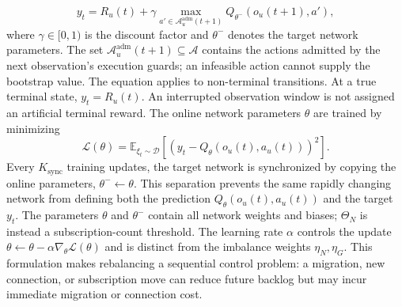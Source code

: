 \begin{equation}
	y_t =
	R_u(t) + \gamma
	\max_{a'\in\mathcal{A}^{\mathrm{adm}}_u(t+1)}Q_{\theta^-}(o_u(t+1),a'),
	\label{eq:dql_target}
\end{equation}
where $\gamma\in[0,1)$ is the discount factor and $\theta^-$ denotes the target
network parameters. The set $\mathcal{A}^{\mathrm{adm}}_u(t+1)\subseteq\mathcal{A}$
contains the actions admitted by the next observation's execution guards;
an infeasible action cannot supply the bootstrap value. The equation applies
to non-terminal transitions. At a true terminal state, $y_t=R_u(t)$.
An interrupted observation window is not assigned an artificial terminal
reward. The online network parameters $\theta$ are trained by
minimizing
\begin{equation}
	\mathcal{L}(\theta)=
	\mathbb{E}_{\xi_t\sim\mathcal{D}}
	\left[
	\left(y_t-Q_\theta(o_u(t),a_u(t))\right)^2
	\right].
	\label{eq:dql_loss}
\end{equation}
Every $K_{\mathrm{sync}}$ training updates, the target network is synchronized by copying the
online parameters, $\theta^- \leftarrow \theta$. This separation prevents the
same rapidly changing network from defining both the prediction
$Q_\theta(o_u(t),a_u(t))$ and the target $y_t$. The parameters $\theta$ and
$\theta^-$ contain all network weights and biases; $\Theta_N$ is instead a
subscription-count threshold. The learning rate $\alpha$ controls the update
$\theta\leftarrow\theta-\alpha\nabla_\theta\mathcal{L}(\theta)$ and is
distinct from the imbalance weights $\eta_N,\eta_G$.
This formulation makes rebalancing a sequential control problem: a migration,
new connection, or subscription move can reduce future backlog but may incur
immediate migration or connection cost.

